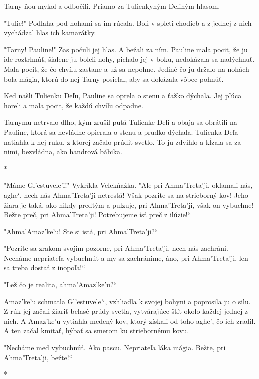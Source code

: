 \documentclass{book}
\begin{document}
Tarny ňou mykol a odbočili. Priamo za Tulienkyným Deliným hlasom.

"$ $Tulie!"$ $ Podlaha pod nohami sa im rúcala. Boli v spleti chodieb a z jednej z nich vychádzal hlas ich kamarátky.

"$ $Tarny! Pauline!"$ $ Zas počuli jej hlas. A bežali za ním. Pauline mala pocit, že ju ide roztrhnúť, šialene ju boleli nohy, pichalo jej v boku, nedokázala sa nadýchnuť. Mala pocit, že čo chvíľu zastane a už sa nepohne. Jediné čo ju držalo na nohách bola mágia, ktorú do nej Tarny posielal, aby sa dokázala vôbec pohnúť.

Keď našli Tulienku Deľu, Pauline sa oprela o stenu a ťažko dýchala. Jej pľúca horeli a mala pocit, že každú chvíľu odpadne.

Tarnymu netrvalo dlho, kým zrušil putá Tulienke Deli a obaja sa obrátili na Pauline, ktorá sa nevládne opierala o stenu a prudko dýchala. Tulienka Deľa natiahla k nej ruku, z ktorej začalo prúdiť svetlo. To ju zdvihlo a kĺzala sa za nimi, bezvládna, ako handrová bábika.

\begin{center}
*
\end{center}

"$ $Máme Gl'estuvele'i!"$ $ Vykríkla Velekňažka. "$ $Ale pri Ahma'Treta'ji, oklamali nás, aghe‘, nech nás Ahma'Treta'ji netrestá! Však pozrite sa na strieborný kov! Jeho žiara je taká, ako nikdy predtým a pulzuje, pri Ahma'Treta'ji, však on vybuchne! Bežte preč, pri Ahma'Treta'ji! Potrebujeme ísť preč z ilúzie!“

"$ $Ahma'Amaz'ke'u! Ste si istá, pri Ahma'Treta'ji?“

"$ $Pozrite sa zrakom svojim pozorne, pri Ahma'Treta'ji, nech nás zachráni. Necháme nepriateľa vybuchnúť a my sa zachránime, áno, pri Ahma'Treta'ji, len sa treba dostať z inopoľa!“

"$ $Lež čo je realita, ahma'Amaz'ke'u?“

Amaz'ke'u schmatla Gl'estuvele'i, vzhliadla k svojej bohyni a poprosila ju o silu. Z rúk jej začali žiariť belasé prúdy svetla, vytvárajúce štít okolo každej jednej z nich. A Amaz'ke'u vytiahla medený kov, ktorý získali od toho aghe', čo ich zradil. A ten začal kmitať, hýbať sa smerom ku striebornému kovu.

"$ $Necháme meď vybuchnúť. Ako pascu. Nepriateľa láka mágia. Bežte, pri Ahma'Treta'ji, bežte!“

\begin{center}
*
\end{center}
\end{document}
